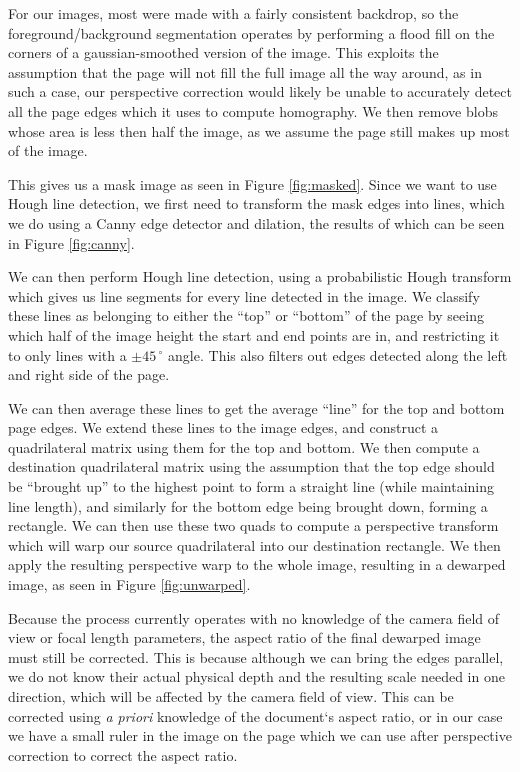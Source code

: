 \documentclass[runningheads,a4paper]{llncs}
\begin{document}
For our images, most were made with a fairly consistent backdrop, so the foreground/background segmentation operates by performing a flood fill on the corners of a gaussian-smoothed version of the image. This exploits the assumption that the page will not fill the full image all the way around, as in such a case, our perspective correction would likely be unable to accurately detect all the page edges which it uses to compute homography. We then remove blobs whose area is less then half the image, as we assume the page still makes up most of the image. 

This gives us a mask image as seen in Figure \ref{fig:masked}. Since we want to use Hough line detection, we first need to transform the mask edges into lines, which we do using a Canny edge detector and dilation, the results of which can be seen in Figure \ref{fig:canny}.

We can then perform Hough line detection, using a probabilistic Hough transform which gives us line segments for every line detected in the image. We classify these lines as belonging to either the “top” or “bottom” of the page by seeing which half of the image height the start and end points are in, and restricting it to only lines with a $\pm 45\,^{\circ}$ angle. This also filters out edges detected along the left and right side of the page.

We can then average these lines to get the average “line” for the top and bottom page edges. We extend these lines to the image edges, and construct a quadrilateral matrix using them for the top and bottom. We then compute a destination quadrilateral matrix using the assumption that the top edge should be “brought up” to the highest point to form a straight line (while maintaining line length), and similarly for the bottom edge being brought down, forming a rectangle. We can then use these two quads to compute a perspective transform which will warp our source quadrilateral into our destination rectangle. We then apply the resulting perspective warp to the whole image, resulting in a dewarped image, as seen in Figure \ref{fig:unwarped}.

Because the process currently operates with no knowledge of the camera field of view or focal length parameters,
the aspect ratio of the final dewarped image must still be corrected. This is because although we can bring the
edges parallel, we do not know their actual physical depth and the resulting scale needed in one direction,
which will be affected by the camera field of view. This can be corrected using \emph{a priori} knowledge of the
document‘s aspect ratio, or in our case we have a small ruler in the image on the page
which we can use after perspective correction to correct the aspect ratio.
\end{document}
